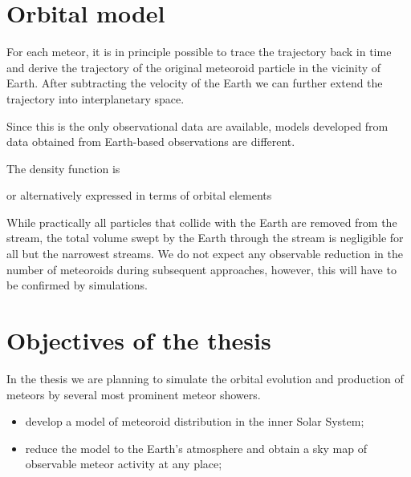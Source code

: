 \section{Orbital model} \label{po}
    For each meteor, it is in principle possible to trace the trajectory back in time
    and derive the trajectory of the original meteoroid particle in the vicinity of Earth.
    After subtracting the velocity of the Earth we can further extend the trajectory
    into interplanetary space.

    Since this is the only observational data are available,
    models developed from data obtained from Earth-based observations are different.

  


    The density function is 
    \eqn{eq:po-rv}{
        \varrho(\vec{r}, \vec{v}, t) \in \left[0, \infty\right).
    }

    or alternatively expressed in terms of orbital elements

    While practically all particles that collide with the Earth are removed from the stream,
    the total volume swept by the Earth through the stream is negligible for all but the narrowest streams.
    We do not expect any observable reduction in the number of meteoroids during subsequent approaches,
    however, this will have to be confirmed by simulations.

\section{Objectives of the thesis} \label{iO}
    In the thesis we are planning to simulate the orbital evolution and production of meteors
    by several most prominent meteor showers.

    \begin{itemize}
        \item develop a model of meteoroid distribution in the inner Solar System;
        \item reduce the model to the Earth's atmosphere and obtain a sky map
            of observable meteor activity at any place;
    \end{itemize}

